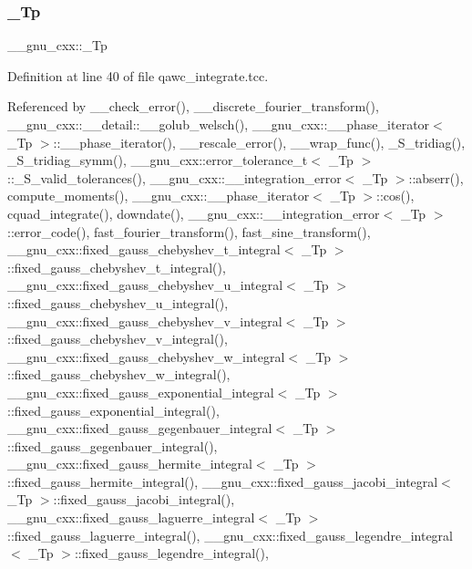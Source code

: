 \mbox{\label{namespace____gnu__cxx_a3b19a9c800ca194374ef9172290f7d79}} 
\subsubsection{\texorpdfstring{\+\_\+\+Tp}{\_Tp}}
{\footnotesize\ttfamily \+\_\+\+\_\+gnu\+\_\+cxx\+::\+\_\+\+Tp}



Definition at line 40 of file qawc\+\_\+integrate.\+tcc.



Referenced by \+\_\+\+\_\+check\+\_\+error(), \+\_\+\+\_\+discrete\+\_\+fourier\+\_\+transform(), \+\_\+\+\_\+gnu\+\_\+cxx\+::\+\_\+\+\_\+detail\+::\+\_\+\+\_\+golub\+\_\+welsch(), \+\_\+\+\_\+gnu\+\_\+cxx\+::\+\_\+\+\_\+phase\+\_\+iterator$<$ \+\_\+\+Tp $>$\+::\+\_\+\+\_\+phase\+\_\+iterator(), \+\_\+\+\_\+rescale\+\_\+error(), \+\_\+\+\_\+wrap\+\_\+func(), \+\_\+\+S\+\_\+tridiag(), \+\_\+\+S\+\_\+tridiag\+\_\+symm(), \+\_\+\+\_\+gnu\+\_\+cxx\+::error\+\_\+tolerance\+\_\+t$<$ \+\_\+\+Tp $>$\+::\+\_\+\+S\+\_\+valid\+\_\+tolerances(), \+\_\+\+\_\+gnu\+\_\+cxx\+::\+\_\+\+\_\+integration\+\_\+error$<$ \+\_\+\+Tp $>$\+::abserr(), compute\+\_\+moments(), \+\_\+\+\_\+gnu\+\_\+cxx\+::\+\_\+\+\_\+phase\+\_\+iterator$<$ \+\_\+\+Tp $>$\+::cos(), cquad\+\_\+integrate(), downdate(), \+\_\+\+\_\+gnu\+\_\+cxx\+::\+\_\+\+\_\+integration\+\_\+error$<$ \+\_\+\+Tp $>$\+::error\+\_\+code(), fast\+\_\+fourier\+\_\+transform(), fast\+\_\+sine\+\_\+transform(), \+\_\+\+\_\+gnu\+\_\+cxx\+::fixed\+\_\+gauss\+\_\+chebyshev\+\_\+t\+\_\+integral$<$ \+\_\+\+Tp $>$\+::fixed\+\_\+gauss\+\_\+chebyshev\+\_\+t\+\_\+integral(), \+\_\+\+\_\+gnu\+\_\+cxx\+::fixed\+\_\+gauss\+\_\+chebyshev\+\_\+u\+\_\+integral$<$ \+\_\+\+Tp $>$\+::fixed\+\_\+gauss\+\_\+chebyshev\+\_\+u\+\_\+integral(), \+\_\+\+\_\+gnu\+\_\+cxx\+::fixed\+\_\+gauss\+\_\+chebyshev\+\_\+v\+\_\+integral$<$ \+\_\+\+Tp $>$\+::fixed\+\_\+gauss\+\_\+chebyshev\+\_\+v\+\_\+integral(), \+\_\+\+\_\+gnu\+\_\+cxx\+::fixed\+\_\+gauss\+\_\+chebyshev\+\_\+w\+\_\+integral$<$ \+\_\+\+Tp $>$\+::fixed\+\_\+gauss\+\_\+chebyshev\+\_\+w\+\_\+integral(), \+\_\+\+\_\+gnu\+\_\+cxx\+::fixed\+\_\+gauss\+\_\+exponential\+\_\+integral$<$ \+\_\+\+Tp $>$\+::fixed\+\_\+gauss\+\_\+exponential\+\_\+integral(), \+\_\+\+\_\+gnu\+\_\+cxx\+::fixed\+\_\+gauss\+\_\+gegenbauer\+\_\+integral$<$ \+\_\+\+Tp $>$\+::fixed\+\_\+gauss\+\_\+gegenbauer\+\_\+integral(), \+\_\+\+\_\+gnu\+\_\+cxx\+::fixed\+\_\+gauss\+\_\+hermite\+\_\+integral$<$ \+\_\+\+Tp $>$\+::fixed\+\_\+gauss\+\_\+hermite\+\_\+integral(), \+\_\+\+\_\+gnu\+\_\+cxx\+::fixed\+\_\+gauss\+\_\+jacobi\+\_\+integral$<$ \+\_\+\+Tp $>$\+::fixed\+\_\+gauss\+\_\+jacobi\+\_\+integral(), \+\_\+\+\_\+gnu\+\_\+cxx\+::fixed\+\_\+gauss\+\_\+laguerre\+\_\+integral$<$ \+\_\+\+Tp $>$\+::fixed\+\_\+gauss\+\_\+laguerre\+\_\+integral(), \+\_\+\+\_\+gnu\+\_\+cxx\+::fixed\+\_\+gauss\+\_\+legendre\+\_\+integral$<$ \+\_\+\+Tp $>$\+::fixed\+\_\+gauss\+\_\+legendre\+\_\+integral(), 